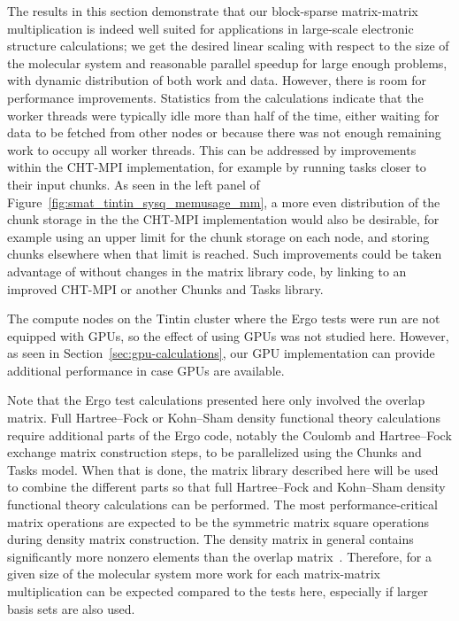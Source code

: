 \documentclass{elsarticle}
\begin{document}
The results in this section demonstrate that our block-sparse
matrix-matrix multiplication is indeed well suited for applications in
large-scale electronic structure calculations; we get the desired
linear scaling with respect to the size of the molecular system and
reasonable parallel speedup for large enough problems, with dynamic distribution of both work
and data. However, there is room for performance improvements.
Statistics from the calculations indicate that
the worker threads were typically idle more than half of the time, either
waiting for data to be fetched from other nodes or because there was
not enough remaining work to occupy all worker threads. This can be addressed
by improvements within the CHT-MPI implementation, for example by
running tasks closer to their input chunks.
As seen in the left panel of Figure~\ref{fig:smat_tintin_sysq_memusage_mm}, 
a more even distribution of the chunk storage in the the CHT-MPI
implementation would also be desirable, for example using an upper
limit for the chunk storage on each node, and storing chunks elsewhere
when that limit is reached.
Such improvements could be taken advantage of
without changes in the matrix library code, by linking to an
improved CHT-MPI or another Chunks and Tasks library.

The compute nodes on the Tintin cluster where the {\sc Ergo} tests
were run are not equipped with GPUs, so the effect of using GPUs was
not studied here. However, as seen in
Section~\ref{sec:gpu-calculations}, our GPU implementation can provide
additional performance in case GPUs are available. 

Note that the {\sc Ergo} test calculations presented here only involved the overlap
matrix. Full Hartree--Fock or Kohn--Sham density functional theory
calculations require additional parts of the {\sc Ergo} code, notably
the Coulomb and Hartree--Fock exchange matrix construction steps, to
be parallelized using the Chunks and Tasks model. When that is done,
the matrix library described here will be used to combine the
different parts so that full Hartree--Fock and Kohn--Sham density
functional theory calculations can be performed. The most
performance-critical matrix operations are expected to be the
symmetric matrix square operations during density matrix construction.
The density matrix in general contains significantly more nonzero
elements than the overlap matrix~\cite{sparsity-JCC:JCC21723}. Therefore, for a given size of the
molecular system more work for each matrix-matrix multiplication can be expected compared to the  tests
here, especially if larger basis sets are also used.
\end{document}

